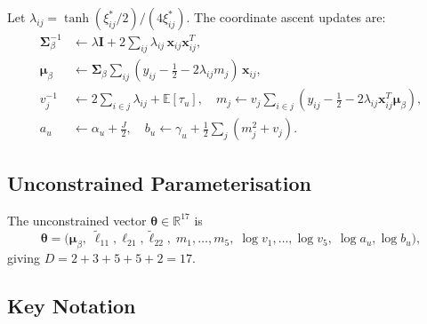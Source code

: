\documentclass[11pt,a4paper]{article}
\newcommand{\E}{\mathbb{E}}
\newcommand{\R}{\mathbb{R}}
\begin{document}
Let $\lambda_{ij} = \tanh(\xi_{ij}^*/2)/(4\xi_{ij}^*)$.
The coordinate ascent updates are:
\begin{align}
  \bm{\Sigma}_\beta^{-1}
    &\leftarrow \lambda\bm{I} + 2\sum_{ij}\lambda_{ij}\,\mathbf{x}_{ij}\mathbf{x}_{ij}^T,
    \label{eq:cavi_Sigma}\\
  \bm{\mu}_\beta
    &\leftarrow \bm{\Sigma}_\beta\!\sum_{ij}
      (y_{ij}-\tfrac{1}{2} - 2\lambda_{ij}m_j)\,\mathbf{x}_{ij},\\
  v_j^{-1}
    &\leftarrow 2\sum_{i\in j}\lambda_{ij} + \E[\tau_u], \quad
  m_j \leftarrow v_j\!\sum_{i\in j}
    (y_{ij}-\tfrac{1}{2} - 2\lambda_{ij}\mathbf{x}_{ij}^T\bm{\mu}_\beta),\\
  a_u &\leftarrow \alpha_u + \tfrac{J}{2}, \quad
  b_u \leftarrow \gamma_u + \tfrac{1}{2}\sum_j (m_j^2 + v_j).
\end{align}

\subsection{Unconstrained Parameterisation}

The unconstrained vector $\bm{\theta} \in \R^{17}$ is
\begin{equation}
  \bm{\theta} = \bigl(\bm{\mu}_\beta,\;
    \tilde{\ell}_{11}, \ell_{21}, \tilde{\ell}_{22},\;
    m_1,\ldots,m_5,\;
    \log v_1,\ldots,\log v_5,\;
    \log a_u, \log b_u
  \bigr),
\end{equation}
giving $D = 2 + 3 + 5 + 5 + 2 = 17$.

\subsection{Key Notation}
\end{document}
